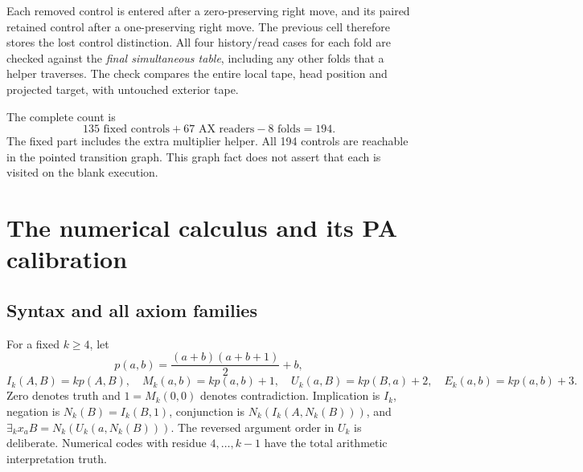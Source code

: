 \documentclass[11pt,letterpaper]{article}
\begin{document}
Each removed control is entered after a zero-preserving right move, and its
paired retained control after a one-preserving right move. The previous cell
therefore stores the lost control distinction. All four history/read cases
for each fold are checked against the \emph{final simultaneous table}, including
any other folds that a helper traverses. The check compares the entire local
tape, head position and projected target, with untouched exterior tape.

The complete count is
\[
 \boxed{\quad 135\text{ fixed controls}+67\text{ AX readers}
                    -8\text{ folds}=194.\quad}
\]
The fixed part includes the extra multiplier helper. All 194 controls are reachable
in the pointed transition graph. This graph fact does not assert that each is
visited on the blank execution.

\section{The numerical calculus and its PA calibration}
\label{sec:calculus}

\subsection{Syntax and all axiom families}

For a fixed $k\ge4$, let
\[
 p(a,b)=\frac{(a+b)(a+b+1)}2+b,
\]
\[
 I_k(A,B)=kp(A,B),\quad M_k(a,b)=kp(a,b)+1,
 \quad U_k(a,B)=kp(B,a)+2,\quad E_k(a,b)=kp(a,b)+3.
\]
Zero denotes truth and $1=M_k(0,0)$ denotes contradiction. Implication is $I_k$,
negation is $N_k(B)=I_k(B,1)$, conjunction is
$N_k(I_k(A,N_k(B)))$, and $\exists_k x_a B=N_k(U_k(a,N_k(B)))$.
The reversed argument order in $U_k$ is deliberate. Numerical codes with
residue $4,\ldots,k-1$ have the total arithmetic interpretation truth.
\end{document}
